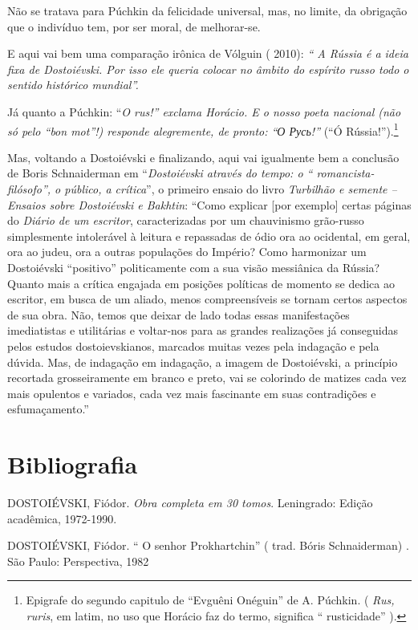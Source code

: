 Não se tratava para Púchkin da felicidade universal, mas, no limite, da
obrigação que o indivíduo tem, por ser moral, de melhorar-se.

E aqui vai bem uma comparação irônica de Vólguin ( 2010): \emph{`` A
Rússia é a ideia fixa de Dostoiévski. Por isso ele queria colocar no
âmbito do espírito russo todo o sentido histórico mundial''.}

Já quanto a Púchkin: ``\emph{O rus!'' exclama Horácio. E o nosso poeta
nacional (não só pelo ``bon mot''!) responde alegremente, de pronto: ``О
Русь!''} (``Ó Rússia!'').\footnote{Epigrafe do segundo capitulo de
  ``Evguêni Onéguin'' de A. Púchkin. ( \emph{Rus, ruris}, em latim, no
  uso que Horácio faz do termo, significa `` rusticidade'' ).}

Mas, voltando a Dostoiévski e finalizando, aqui vai igualmente bem a
conclusão de Boris Schnaiderman em ``\emph{Dostoiévski através do tempo:
o `` romancista-filósofo'', o público, a crítica}'', o primeiro ensaio
do livro \emph{Turbilhão e semente -- Ensaios sobre Dostoiévski e
Bakhtin}: ``Como explicar {[}por exemplo{]} certas páginas do
\emph{Diário de um escritor}, caracterizadas por um chauvinismo
grão-russo simplesmente intolerável à leitura e repassadas de ódio ora
ao ocidental, em geral, ora ao judeu, ora a outras populações do
Império? Como harmonizar um Dostoiévski ``positivo'' politicamente com a
sua visão messiânica da Rússia? Quanto mais a crítica engajada em
posições políticas de momento se dedica ao escritor, em busca de um
aliado, menos compreensíveis se tornam certos aspectos de sua obra. Não,
temos que deixar de lado todas essas manifestações imediatistas e
utilitárias e voltar-nos para as grandes realizações já conseguidas
pelos estudos dostoievskianos, marcados muitas vezes pela indagação e
pela dúvida. Mas, de indagação em indagação, a imagem de Dostoiévski, a
princípio recortada grosseiramente em branco e preto, vai se colorindo
de matizes cada vez mais opulentos e variados, cada vez mais fascinante
em suas contradições e esfumaçamento.''

\section{Bibliografia}

DOSTOIÉVSKI, Fiódor. \emph{Obra completa em 30 tomos}. Leningrado:
Edição acadêmica, 1972-1990.

DOSTOIÉVSKI, Fiódor. `` O senhor Prokhartchin'' ( trad. Bóris
Schnaiderman) . São Paulo: Perspectiva, 1982

